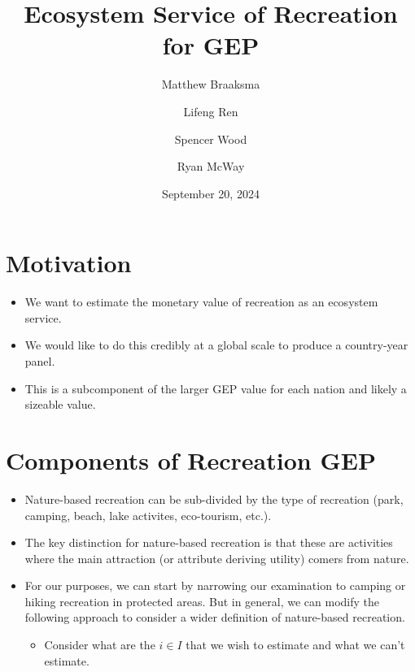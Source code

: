 \documentclass[
  letterpaper,
  DIV=11,
  numbers=noendperiod]{scrartcl}
\title{Ecosystem Service of Recreation for GEP}
\author{Matthew Braaksma \and Lifeng Ren \and Spencer Wood \and Ryan
McWay}
\date{September 20, 2024}
\providecommand{\tightlist}{%
  \setlength{\itemsep}{0pt}\setlength{\parskip}{0pt}}\usepackage{longtable,booktabs,array}
\renewcommand*\contentsname{Table of contents}
\newcommand\contentsname{Table of contents}
\begin{document}
\maketitle
\ifdefined\Shaded\renewenvironment{Shaded}{\begin{tcolorbox}[frame hidden, boxrule=0pt, interior hidden, borderline west={3pt}{0pt}{shadecolor}, breakable, enhanced, sharp corners]}{\end{tcolorbox}}\fi

\renewcommand*\contentsname{Table of contents}
{
\hypersetup{linkcolor=}
\setcounter{tocdepth}{3}
\tableofcontents
}
\hypertarget{motivation}{%
\section{Motivation}\label{motivation}}

\begin{itemize}
\tightlist
\item
  We want to estimate the monetary value of recreation as an ecosystem
  service.
\item
  We would like to do this credibly at a global scale to produce a
  country-year panel.
\item
  This is a subcomponent of the larger GEP value for each nation and
  likely a sizeable value.
\end{itemize}

\hypertarget{components-of-recreation-gep}{%
\section{Components of Recreation
GEP}\label{components-of-recreation-gep}}

\begin{itemize}
\tightlist
\item
  Nature-based recreation can be sub-divided by the type of recreation
  (park, camping, beach, lake activites, eco-tourism, etc.).
\item
  The key distinction for nature-based recreation is that these are
  activities where the main attraction (or attribute deriving utility)
  comers from nature.
\item
  For our purposes, we can start by narrowing our examination to camping
  or hiking recreation in protected areas. But in general, we can modify
  the following approach to consider a wider definition of nature-based
  recreation.

  \begin{itemize}
  \tightlist
  \item
    Consider what are the \(i \in I\) that we wish to estimate and what
    we can't estimate.
  \end{itemize}
\end{itemize}
\end{document}
